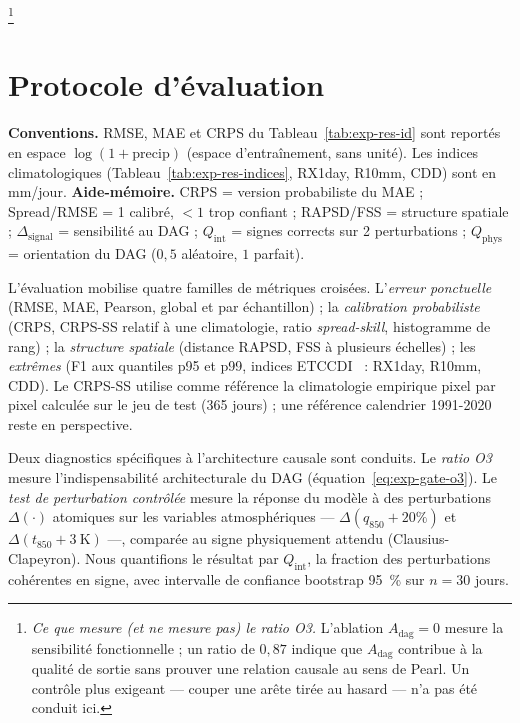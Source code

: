 \documentclass[14pt,a4paper,openany]{extreport}
\theoremstyle{definition}
\newcommand{\Adag}{\ensuremath{A_{\mathrm{dag}}}}
\begin{document}
\footnote{\emph{Ce que mesure (et ne mesure pas) le ratio O3.} L'ablation $\Adag=0$ mesure la sensibilité fonctionnelle ; un ratio de $0{,}87$ indique que $\Adag$ contribue à la qualité de sortie sans prouver une relation causale au sens de Pearl. Un contrôle plus exigeant --- couper une arête tirée au hasard --- n'a pas été conduit ici.}

\section{Protocole d'évaluation}
\label{sec:exp-protoc}

\textbf{Conventions.} RMSE, MAE et CRPS du Tableau~\ref{tab:exp-res-id} sont reportés en espace $\log(1+\mathrm{precip})$ (espace d'entraînement, sans unité). Les indices climatologiques (Tableau~\ref{tab:exp-res-indices}, RX1day, R10mm, CDD) sont en mm/jour. \textbf{Aide-mémoire.} CRPS = version probabiliste du MAE ; Spread/RMSE = 1 calibré, $<1$ trop confiant ; RAPSD/FSS = structure spatiale ; $\Delta_{\mathrm{signal}}$ = sensibilité au DAG ; $Q_{\mathrm{int}}$ = signes corrects sur 2 perturbations ; $Q_{\mathrm{phys}}$ = orientation du DAG ($0{,}5$ aléatoire, $1$ parfait).

L'évaluation mobilise quatre familles de métriques croisées. L'\emph{erreur ponctuelle} (RMSE, MAE, Pearson, global et par échantillon) ; la \emph{calibration probabiliste} (CRPS, CRPS-SS relatif à une climatologie, ratio \emph{spread-skill}, histogramme de rang) ; la \emph{structure spatiale} (distance RAPSD, FSS à plusieurs échelles) ; les \emph{extrêmes} (F1 aux quantiles p95 et p99, indices ETCCDI~\cite{zhang_etccdi_2011} : RX1day, R10mm, CDD). Le CRPS-SS utilise comme référence la climatologie empirique pixel par pixel calculée sur le jeu de test (365 jours) ; une référence calendrier 1991-2020 reste en perspective.

Deux diagnostics spécifiques à l'architecture causale sont conduits. Le \emph{ratio O3} mesure l'indispensabilité architecturale du DAG (équation~\ref{eq:exp-gate-o3}). Le \emph{test de perturbation contrôlée} mesure la réponse du modèle à des perturbations $\Delta(\cdot)$ atomiques sur les variables atmosphériques --- $\Delta(q_{850} +20\%)$ et $\Delta(t_{850} +3~\mathrm{K})$ ---, comparée au signe physiquement attendu (Clausius-Clapeyron). Nous quantifions le résultat par $Q_{\mathrm{int}}$, la fraction des perturbations cohérentes en signe, avec intervalle de confiance bootstrap 95~\% sur $n = 30$ jours.
\end{document}
